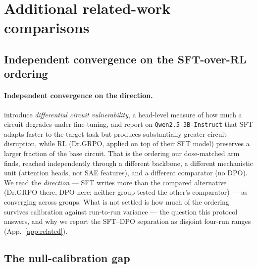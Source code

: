 \documentclass{article}
\begin{document}
\section{Additional related-work comparisons}

\subsection{Independent convergence on the SFT-over-RL ordering}\label{app:related-convergence}
\paragraph{Independent convergence on the direction.} \citet{rojasnunez2026forgetting} introduce \emph{differential circuit vulnerability}, a head-level measure of how much a circuit degrades under fine-tuning, and report on \texttt{Qwen2.5-3B-Instruct} that SFT adapts faster to the target task but produces substantially greater circuit disruption, while RL (Dr.GRPO, applied on top of their SFT model) preserves a larger fraction of the base circuit. That is the ordering our dose-matched arm finds, reached independently through a different backbone, a different mechanistic unit (attention heads, not SAE features), and a different comparator (no DPO). We read the \emph{direction} --- SFT writes more than the compared alternative (Dr.GRPO there, DPO here; neither group tested the other's comparator) --- as converging across groups. What is not settled is how much of the ordering survives calibration against run-to-run variance --- the question this protocol answers, and why we report the SFT--DPO separation as disjoint four-run ranges (App.~\ref{app:related}).



\subsection{The null-calibration gap}\label{app:related-null-gap}
\end{document}
